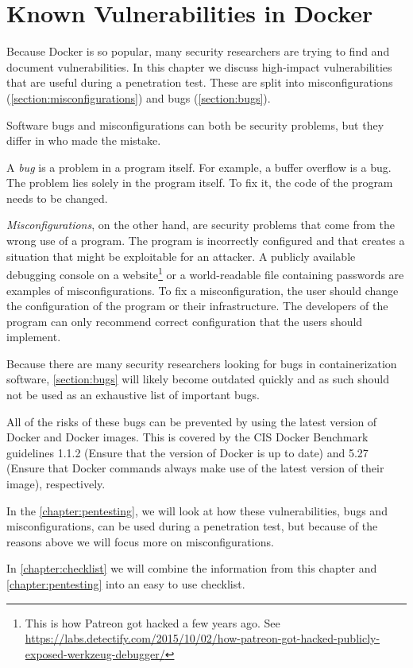 \chapter{Known Vulnerabilities in Docker}\label{chapter:vulnerabilities}
Because Docker is so popular, many security researchers are trying to find and document vulnerabilities. In this chapter we discuss high-impact vulnerabilities that are useful during a penetration test. These are split into misconfigurations (\autoref{section:misconfigurations}) and bugs (\autoref{section:bugs}).

\medskip

Software bugs and misconfigurations can both be security problems, but they differ in who made the mistake.

A \emph{bug} is a problem in a program itself. For example, a buffer overflow is a bug. The problem lies solely in the program itself. To fix it, the code of the program needs to be changed.

\emph{Misconfigurations}, on the other hand, are security problems that come from the wrong use of a program. The program is incorrectly configured and that creates a situation that might be exploitable for an attacker. A publicly available debugging console on a website\footnote{This is how Patreon got hacked a few years ago. See \url{https://labs.detectify.com/2015/10/02/how-patreon-got-hacked-publicly-exposed-werkzeug-debugger/}} or a world-readable file containing passwords are examples of misconfigurations. To fix a misconfiguration, the user should change the configuration of the program or their infrastructure. The developers of the program can only recommend correct configuration that the users should implement.

\medskip

Because there are many security researchers looking for bugs in containerization software, \autoref{section:bugs} will likely become outdated quickly and as such should not be used as an exhaustive list of important bugs.

All of the risks of these bugs can be prevented by using the latest version of Docker and Docker images. This is covered by the CIS Docker Benchmark guidelines 1.1.2 (Ensure that the version of Docker is up to date) and 5.27 (Ensure that Docker commands always make use of the latest version of their image), respectively.

In the \autoref{chapter:pentesting}, we will look at how these vulnerabilities, bugs and misconfigurations, can be used during a penetration test, but because of the reasons above we will focus more on misconfigurations.

\medskip

In \autoref{chapter:checklist} we will combine the information from this chapter and \autoref{chapter:pentesting} into an easy to use checklist.



